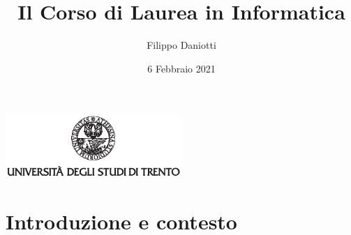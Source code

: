 \documentclass[aspectratio=1610]{beamer}
\title{Il Corso di Laurea in Informatica}
\author{Filippo Daniotti}
\date{6 Febbraio 2021}
\institute[DISI]{Dipartimento di Ingegneria e Scienza dell'Informazione}
\begin{document}
	\begin{frame}[plain]
		\addtocounter{framenumber}{-1}
		\centering
		\includegraphics[width=0.5\textwidth, keepaspectratio]{logo-unitn.eps}		
		\titlepage
	\end{frame}


	\section{Introduzione e contesto}
\end{document}
